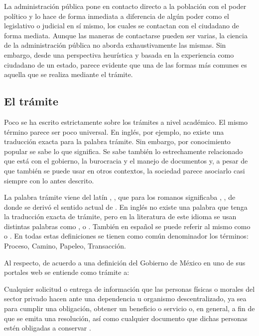 La administración pública pone en contacto directo a la población con el poder político \cite{mostajomachicadoDerechoAdministrativoAdministracion2016} y lo hace de forma inmediata a diferencia de algún poder como el legislativo o judicial en sí mismo, los cuales se contactan con el ciudadano de forma mediata. Aunque las maneras de contactarse pueden ser varias, la ciencia de la administración pública no aborda exhaustivamente las mismas. Sin embargo, desde una perspectiva heurística y basada en la experiencia como ciudadano de un estado, parece evidente que una de las formas más comunes es aquella que se realiza mediante el trámite.

\subsection{El trámite}

Poco se ha escrito estrictamente sobre los trámites a nivel académico. El mismo término parece ser poco universal. En inglés, por ejemplo, no existe una traducción exacta para la palabra trámite. Sin
embargo, por conocimiento popular se sabe lo que significa. Se sabe
también lo estrechamente relacionado que está con el gobierno, la burocracia y
el manejo de documentos y, a pesar de que también se puede usar en otros contextos, la sociedad parece asociarlo casi siempre con lo antes descrito.

La palabra trámite viene del latín ,
, que para los romanos significaba ,
, de donde se derivó el sentido actual de \cite{TramiteCastellanoPagina}. En inglés no existe una palabra que
tenga la traducción exacta de trámite, pero en la literatura de este idioma se usan distintas palabras como
,  o .
También en español se puede referir al mismo como  o . En todas estas definiciones se tienen como común denominador
los términos: Proceso, Camino, Papeleo, Transacción.

Al respecto, de acuerdo a una definición del Gobierno de México en uno de sus
portales web se entiende como trámite a:

\begin{displayquote}
    Cualquier solicitud o entrega de información que las
    personas físicas o morales del sector privado hacen ante una dependencia u
    organismo descentralizado, ya sea para cumplir una obligación, obtener un
    beneficio o servicio o, en general, a fin de que se emita una resolución, así
    como cualquier documento que dichas personas estén obligadas a conservar
    \cite{epnQueEsTramite}.
\end{displayquote}

